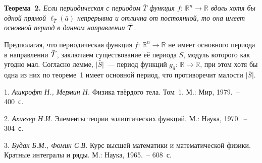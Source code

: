 \textbf{Теорема~2.} {\it Если периодическая с периодом $\bar{T}$ функция $f:\,{\mathbb R}^{n}\to {\mathbb R}$ вдоль хотя бы одной прямой $\ell_{\bar{T}}(\bar{a})$ непрерывна и отлична от постоянной, то она имеет основной период в данном направлении $\bar{{\cal T}}$.}

Предполагая, что периодическая функция $f:\,{\mathbb R}^{n}\to {\mathbb R}$ не имеет основного периода в направлении $\bar{{\cal T}}$, заключаем существование её периода $\bar{S}$, модуль которого как угодно мал. Согласно лемме, $\vert\bar{S}\vert$~--- период функций $g_{\bar{a}}:\,{\mathbb R}\to {\mathbb R}$, при этом хотя бы одна из них по теореме~1 имеет основной период, что противоречит малости $\vert\bar{S}\vert$.

\litlist

1. {\it Ашкрофт Н., Мермин Н.} Физика твёрдого тела. Том~1. М.: Мир, 1979.~-- 400~с.

2. {\it Ахиезер Н.И.} Элементы теории эллиптических функций. М.:  Наука, 1970.~-- 304~с.

3. {\it Будак Б.М., Фомин С.В.} Курс высшей математики и математической физики. Кратные интегралы и ряды. М.: Наука, 1965.~-- 608~с.
